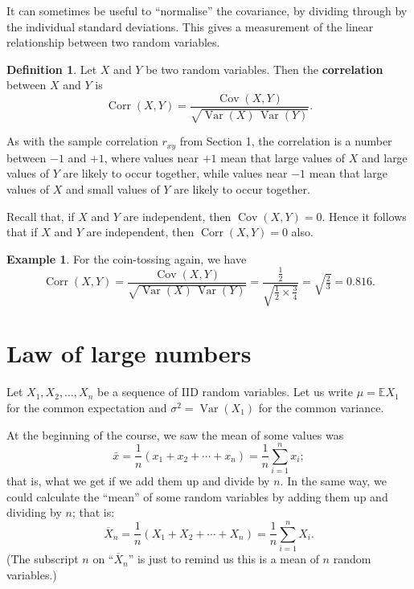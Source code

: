 \documentclass[
  a4paper,
]{book}
\theoremstyle{definition}
\newtheorem{definition}{Definition}[chapter]
\theoremstyle{definition}
\newtheorem{example}{Example}[chapter]
\theoremstyle{definition}
\theoremstyle{definition}
\theoremstyle{remark}
\begin{document}
It can sometimes be useful to ``normalise'' the covariance, by dividing through by the individual standard deviations. This gives a measurement of the linear relationship between two random variables.

\begin{definition}
Let \(X\) and \(Y\) be two random variables. Then the \textbf{correlation} between \(X\) and \(Y\) is
\[ \operatorname{Corr}(X,Y) = \frac{\operatorname{Cov}(X,Y)} {\sqrt{\operatorname{Var}(X)\,\operatorname{Var}(Y)}} . \]
\end{definition}

As with the sample correlation \(r_{xy}\) from Section 1, the correlation is a number between \(-1\) and \(+1\), where values near \(+1\) mean that large values of \(X\) and large values of \(Y\) are likely to occur together, while values near \(-1\) mean that large values of \(X\) and small values of \(Y\) are likely to occur together.

Recall that, if \(X\) and \(Y\) are independent, then \(\operatorname{Cov}(X,Y) = 0\). Hence it follows that if \(X\) and \(Y\) are independent, then \(\operatorname{Corr}(X,Y) = 0\) also.

\begin{example}
For the coin-tossing again, we have
\[ \operatorname{Corr}(X,Y) = \frac{\operatorname{Cov}(X,Y)} {\sqrt{\operatorname{Var}(X)\,\operatorname{Var}(Y)}} = \frac{\frac12}{\sqrt{\frac12 \times \frac34}} = \sqrt{\tfrac23} = 0.816 .    \]
\end{example}

\hypertarget{lln}{%
\section{Law of large numbers}\label{lln}}

Let \(X_1, X_2, \dots, X_n\) be a sequence of IID random variables. Let us write \(\mu = \mathbb EX_1\) for the common expectation and \(\sigma^2 = \operatorname{Var}(X_1)\) for the common variance.

At the beginning of the course, we saw the mean of some values was
\[ \bar x = \frac{1}{n} (x_1 + x_2 + \cdots + x_n) = \frac{1}{n} \sum_{i=1}^n x_i ; \]
that is, what we get if we add them up and divide by \(n\). In the same way, we could calculate the ``mean'' of some random variables by adding them up and dividing by \(n\); that is:
\[ \overline X_n = \frac{1}{n} (X_1 + X_2 + \cdots + X_n) = \frac{1}{n} \sum_{i=1}^n X_i . \]
(The subscript \(n\) on ``\(\overline X_n\)'' is just to remind us this is a mean of \(n\) random variables.)
\end{document}
